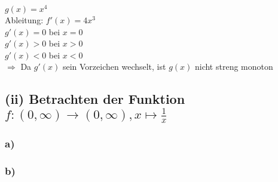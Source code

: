 \documentclass{article}
\begin{document}
\begin{center}
$g(x)=x^4$ \\
Ableitung: $f'(x)=4x^3$ \\
$g'(x) = 0$ bei $x=0$ \\
$g'(x) > 0$ bei $x > 0$ \\
$g'(x) < 0$ bei $x < 0$ \\
$\Longrightarrow$ Da $g'(x)$ sein Vorzeichen wechselt, ist $g(x)$ nicht streng monoton
\end{center}

\subsection{(ii) Betrachten der Funktion $f:(0,\infty)\xrightarrow{}(0,\infty), x \mapsto \frac{1}{x}$}
\subsubsection{a)}

\subsubsection{b)}
\end{document}
